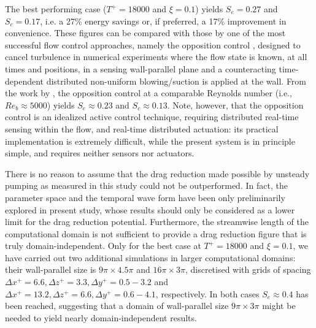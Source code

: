 \documentclass[lineno]{jfm}
\begin{document}
The best performing case ($T^+=18000$ and $\xi=0.1$) yields $S_e=0.27$ and $S_c=0.17$, i.e. a 27\% energy savings or, if preferred, a 17\% improvement in convenience. These figures can be compared with those by one of the most successful flow control approaches, namely the opposition control \citep{choi-moin-kim-1994}, designed to cancel turbulence in numerical experiments where the flow state is known, at all times and positions, in a sensing wall-parallel plane and a counteracting time-dependent distributed non-uniform blowing/suction is applied at the wall. From the work by \cite{frohnapfel-hasegawa-quadrio-2012}, the opposition control at a comparable Reynolds number (i.e., $Re_b \approx 5000$) yields $S_e \approx 0.23$ and $S_c \approx 0.13$. 
Note, however, that the opposition control is an idealized active control technique, requiring distributed real-time sensing within the flow, and real-time distributed actuation: its practical implementation is extremely difficult, while the present system is in principle simple, and requires neither sensors nor actuators. 

There is no reason to assume that the drag reduction made possible by unsteady pumping as measured in this study could not be outperformed. In fact, the parameter space and the temporal wave form have been only preliminarily explored in present study, whose results should only be considered as a lower limit for the drag reduction potential.
Furthermore, the streamwise length of the computational domain is not sufficient to provide a drag reduction figure that is truly domain-independent. 
Only for the best case at $T^+=18000$ and $\xi=0.1$, we have carried out two additional simulations in larger computational domains: their wall-parallel size is $9\pi \times 4.5\pi$ and $16\pi \times 3\pi$, discretised with grids of spacing $\Delta x^+ = 6.6, \Delta z^+ = 3.3, \Delta y^+ = 0.5 - 3.2$ and $\Delta x^+ = 13.2, \Delta z^+ = 6.6, \Delta y^+ = 0.6 - 4.1$, respectively. 
In both cases $S_e \approx 0.4$ has been reached, suggesting that a domain of wall-parallel size  $9\pi \times 3\pi$ might be needed to yield nearly domain-independent results. 
\end{document}
